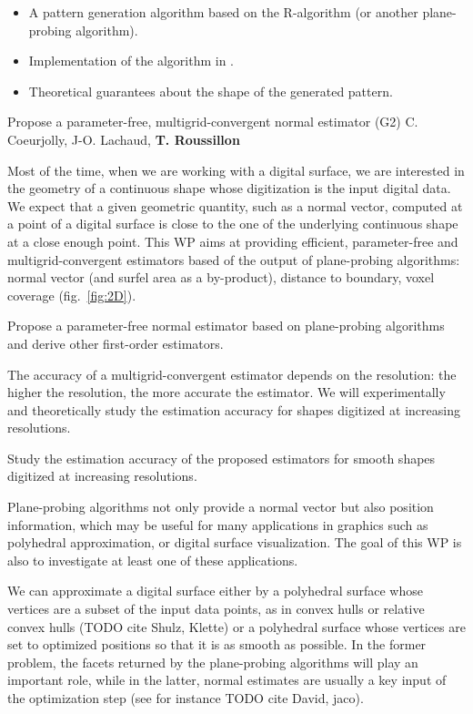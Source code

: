 \Success
\begin{itemize}
  \item A pattern generation algorithm based on the R-algorithm (or another plane-probing algorithm).
  \item Implementation of the algorithm in \DGtal.
  \item Theoretical guarantees about the shape of the generated pattern. 
\end{itemize}

   {Propose a parameter-free, multigrid-convergent normal estimator (G2)}
   {C. Coeurjolly, J-O. Lachaud, \textbf{T. Roussillon}}
\medskip

 Most of the time, when we are working with a digital surface, we are 
interested in the geometry of a continuous shape whose digitization is the input digital data.
We expect that a given geometric quantity, such as a normal vector, computed at a point of a digital surface
is close to the one of the underlying continuous shape at a close enough point. 
This WP aims at providing efficient, parameter-free and multigrid-convergent estimators based of
the output of plane-probing algorithms: normal vector (and surfel area as a by-product),
distance to boundary, voxel coverage (fig.~\ref{fig:2D}).

\begin{Task}
  \label{task:normal}
  Propose a parameter-free normal estimator based on plane-probing algorithms and
  derive other first-order estimators.  
\end{Task}

The accuracy of a multigrid-convergent estimator depends on the resolution: the higher the resolution,
the more accurate the estimator. We will experimentally and theoretically study the estimation accuracy
for shapes digitized at increasing resolutions. 

\begin{Task}
  \label{task:conv}
  Study the estimation accuracy of the proposed estimators for smooth shapes digitized at increasing resolutions. 
\end{Task}

Plane-probing algorithms not only provide a normal vector but also position information,
which may be useful for many applications in graphics such as polyhedral approximation,
 or digital surface visualization. The goal of this WP is also to investigate at least
one of these applications.   


We can approximate a digital surface either by a polyhedral surface whose vertices 
are a subset of the input data points, as in convex hulls or relative convex hulls (TODO cite Shulz, Klette)
or a polyhedral surface whose vertices are set to optimized positions so that it is
as smooth as possible. In the former problem, the facets returned by the
plane-probing algorithms will play an important role, while in the latter,
normal estimates are usually a key input of the optimization step (see for instance
TODO cite David, jaco).  

